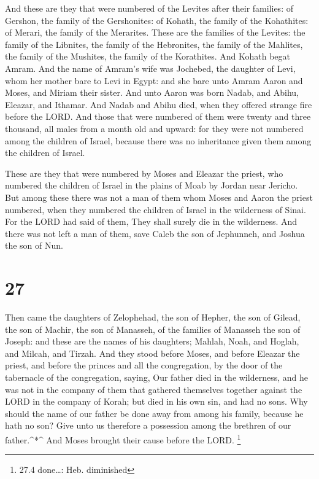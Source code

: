  And these are they that were numbered of the Levites after
their families: of Gershon, the family of the Gershonites: of Kohath,
the family of the Kohathites: of Merari, the family of the Merarites.
 These are the families of the Levites: the family of the
Libnites, the family of the Hebronites, the family of the Mahlites, the
family of the Mushites, the family of the Korathites. And Kohath begat
Amram.  And the name of Amram's wife was Jochebed, the
daughter of Levi, whom her mother bare to Levi in Egypt: and she bare
unto Amram Aaron and Moses, and Miriam their sister.  And
unto Aaron was born Nadab, and Abihu, Eleazar, and Ithamar.
 And Nadab and Abihu died, when they offered strange fire
before the LORD.  And those that were numbered of them were
twenty and three thousand, all males from a month old and upward: for
they were not numbered among the children of Israel, because there was
no inheritance given them among the children of Israel.

 These are they that were numbered by Moses and Eleazar the
priest, who numbered the children of Israel in the plains of Moab by
Jordan near Jericho.  But among these there was not a man
of them whom Moses and Aaron the priest numbered, when they numbered the
children of Israel in the wilderness of Sinai.  For the
LORD had said of them, They shall surely die in the wilderness. And
there was not left a man of them, save Caleb the son of Jephunneh, and
Joshua the son of Nun.

\hypertarget{section-26}{%
\section{27}\label{section-26}}

 Then came the daughters of Zelophehad, the son of Hepher,
the son of Gilead, the son of Machir, the son of Manasseh, of the
families of Manasseh the son of Joseph: and these are the names of his
daughters; Mahlah, Noah, and Hoglah, and Milcah, and Tirzah.
 And they stood before Moses, and before Eleazar the priest,
and before the princes and all the congregation, by the door of the
tabernacle of the congregation, saying,  Our father died in
the wilderness, and he was not in the company of them that gathered
themselves together against the LORD in the company of Korah; but died
in his own sin, and had no sons.  Why should the name of our
father be done away from among his family, because he hath no son? Give
unto us therefore a possession among the brethren of our
father.\^{}*\^{}  And Moses brought their cause before the
LORD. \footnote{27.4 done\ldots: Heb. diminished}

